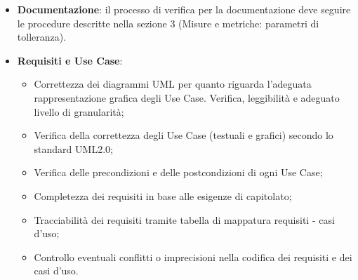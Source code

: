 \documentclass[a4paper,11pt]{article}
\begin{document}
\begin{itemize}
\item \textbf{Documentazione}: il processo di verifica per la documentazione deve seguire le procedure descritte nella sezione 3 (Misure e metriche: parametri di tolleranza).
\item \textbf{Requisiti e Use Case}: 
\begin{itemize}
\item Correttezza dei diagrammi UML per quanto riguarda l'adeguata rappresentazione grafica degli Use Case. Verifica, leggibilità e adeguato livello di granularità;
\item Verifica della correttezza degli Use Case (testuali e grafici) secondo lo standard UML2.0;
\item Verifica delle precondizioni e delle postcondizioni di ogni Use Case;
\item Completezza dei requisiti in base alle esigenze di capitolato;
\item Tracciabilità dei requisiti tramite tabella di mappatura requisiti - casi d'uso;
\item Controllo eventuali conflitti o imprecisioni nella codifica dei requisiti e dei casi d'uso.
\end{itemize}
 

\end{itemize}
\end{document}
